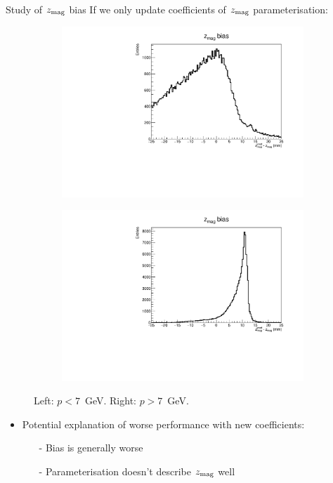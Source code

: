 \documentclass[xcolor={dvipsnames}]{beamer}
\begin{document}
\begin{frame}{Study of $z_{\rm mag}$ bias}
  \vspace{0.0cm}
  {\Large If we only update coefficients of $z_{\rm mag}$ parameterisation:}
  \begin{figure}[htb]
    \centering
    \begin{subfigure}{0.50\textwidth}
      \includegraphics[width=1\textwidth]{Plots/z_mag_position_bias_bad_parameterisation_low_p.pdf}
    \end{subfigure}%
    \begin{subfigure}{0.50\textwidth}
      \includegraphics[width=1\textwidth]{Plots/z_mag_position_bias_bad_parameterisation_high_p.pdf}
    \end{subfigure}
    \vspace{-0.2cm}
    \caption*{Left: $p < 7$~GeV. Right: $p > 7$~GeV.}
  \end{figure}
  \vspace{-0.5cm}
  \begin{itemize}
    \item{Potential explanation of worse performance with new coefficients:}
    \begin{itemize}
      \item[-]{Bias is generally worse}
      \item[-]{Parameterisation doesn't describe $z_{\rm mag}$ well}
    \end{itemize}
  \end{itemize}
\end{frame}
\end{document}
